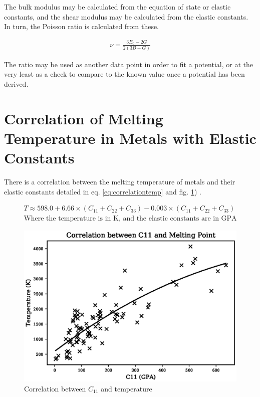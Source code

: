 The bulk modulus may be calculated from the equation of state or elastic constants, and the shear modulus may be calculated from the elastic constants.  In turn, the Poisson ratio is calculated from these.  

\begin{equation}
\begin{split}
\nu = \frac{3 B_0 - 2G}{2(3B+G)}
\end{split}
\label{eq:PoissonRatio2}
\end{equation}

The ratio may be used as another data point in order to fit a potential, or at the very least as a check to compare to the known value once a potential has been derived.


\FloatBarrier
\section{Correlation of Melting Temperature in Metals with Elastic Constants}

There is a correlation between the melting temperature of metals and their elastic constants detailed in eq. \ref{eq:correlationtemp} and fig. \ref{fig:c11correlation}) \cite{ElasticMeltingTemp}.  

\begin{equation}
\begin{split}
T \approx 598.0 + 6.66 \times (C_{11} + C_{22} + C_{33}) - 0.003 \times (C_{11} + C_{22} + C_{33}) \\
\text{Where the temperature is in K, and the elastic constants are in GPA}
\end{split}
\label{eq:correlationtemp}
\end{equation}

\begin{figure}[htbp]
  \begin{center}
    \includegraphics[scale=0.80]{chapters/interatomic_potential_fitting/plots/c11_temperature}%
    \caption{Correlation between $C_{11}$ and temperature}
    \label{fig:c11correlation}
  \end{center}
\end{figure}

